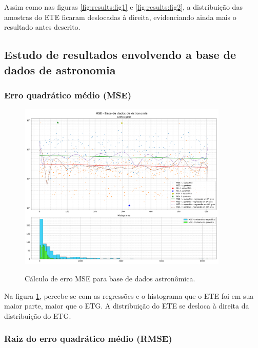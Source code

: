 Assim como nas figuras \ref{fig:results:fig1} e \ref{fig:results:fig2}, a distribuição das amostras do ETE ficaram deslocadas à direita, evidenciando ainda mais o resultado antes descrito.

\subsection{Estudo de resultados envolvendo a base de dados de astronomia}
\label{sec:result:astronomy}

\subsubsection{Erro quadrático médio (MSE)}
\label{sec:result:astronomy:mse}

\begin{figure}[H]
    \centering
    \caption{Cálculo de erro MSE para base de dados astronômica.}
    \includegraphics[width=10cm]{fig/resultados/astronomy/png/mse_astronomy_compound.png}
    \label{fig:results:fig5}
\end{figure}

Na figura \ref{fig:results:fig5}, percebe-se com as regressões e o histograma que o ETE foi em sua maior parte, maior que o ETG. A distribuição do ETE se desloca à direita da distribuição do ETG.

\subsubsection{Raiz do erro quadrático médio (RMSE)}
\label{sec:result:astronomy:rmse}

